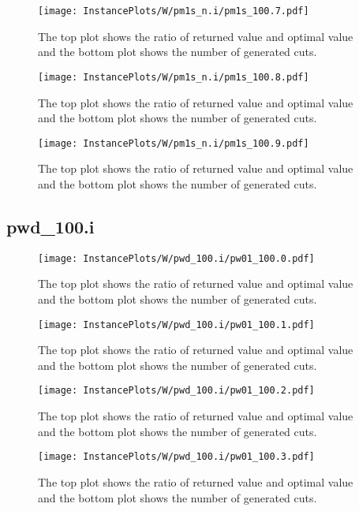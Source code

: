 \documentclass[10pt,a4paper]{article}
\begin{document}
\begin{figure}[H]
\texttt{[image: InstancePlots/W/pm1s\_n.i/pm1s\_100.7.pdf]}
\caption{The top plot shows the ratio of returned value and optimal value     and the bottom plot shows the number of generated cuts.}
\end{figure}

\begin{figure}[H]
\texttt{[image: InstancePlots/W/pm1s\_n.i/pm1s\_100.8.pdf]}
\caption{The top plot shows the ratio of returned value and optimal value     and the bottom plot shows the number of generated cuts.}
\end{figure}

\begin{figure}[H]
\texttt{[image: InstancePlots/W/pm1s\_n.i/pm1s\_100.9.pdf]}
\caption{The top plot shows the ratio of returned value and optimal value     and the bottom plot shows the number of generated cuts.}
\end{figure}

\subsection{pwd\_100.i}
\begin{figure}[H]
\texttt{[image: InstancePlots/W/pwd\_100.i/pw01\_100.0.pdf]}
\caption{The top plot shows the ratio of returned value and optimal value     and the bottom plot shows the number of generated cuts.}
\end{figure}

\begin{figure}[H]
\texttt{[image: InstancePlots/W/pwd\_100.i/pw01\_100.1.pdf]}
\caption{The top plot shows the ratio of returned value and optimal value     and the bottom plot shows the number of generated cuts.}
\end{figure}

\begin{figure}[H]
\texttt{[image: InstancePlots/W/pwd\_100.i/pw01\_100.2.pdf]}
\caption{The top plot shows the ratio of returned value and optimal value     and the bottom plot shows the number of generated cuts.}
\end{figure}

\begin{figure}[H]
\texttt{[image: InstancePlots/W/pwd\_100.i/pw01\_100.3.pdf]}
\caption{The top plot shows the ratio of returned value and optimal value     and the bottom plot shows the number of generated cuts.}
\end{figure}
\end{document}
